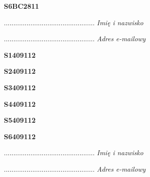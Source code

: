 \begin{turn}{90}\huge \textbf{S6BC2811}\end{turn}

\begin{turn}{90}\begin{minipage}{\linewidth} \vspace{20mm} ................................................  \textit{Imię i nazwisko}\end{minipage}\end{turn}

\begin{turn}{90}\begin{minipage}{\linewidth} \vspace{20mm} ................................................  \textit{Adres e-mailowy}\end{minipage}\end{turn}

\begin{turn}{90}\huge \textbf{S1409112}\end{turn}

\begin{turn}{90}\huge \textbf{S2409112}\end{turn}

\begin{turn}{90}\huge \textbf{S3409112}\end{turn}

\begin{turn}{90}\huge \textbf{S4409112}\end{turn}

\begin{turn}{90}\huge \textbf{S5409112}\end{turn}

\begin{turn}{90}\huge \textbf{S6409112}\end{turn}

\begin{turn}{90}\begin{minipage}{\linewidth} \vspace{20mm} ................................................  \textit{Imię i nazwisko}\end{minipage}\end{turn}

\begin{turn}{90}\begin{minipage}{\linewidth} \vspace{20mm} ................................................  \textit{Adres e-mailowy}\end{minipage}\end{turn}

